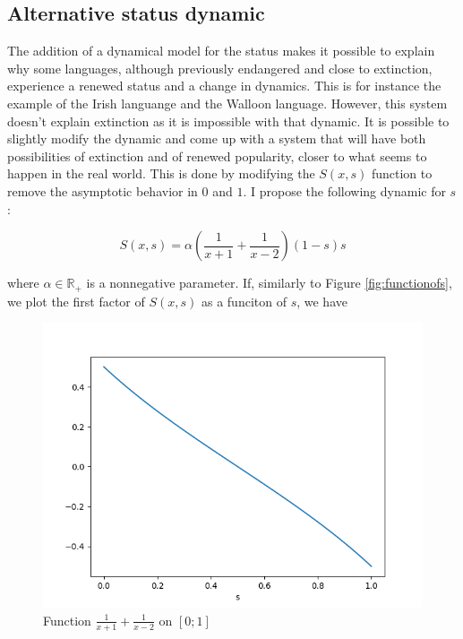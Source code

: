 \documentclass{article}
\begin{document}
\subsection*{Alternative status dynamic}
The addition of a dynamical model for the status makes it possible to explain why some languages, although previously endangered and close to extinction, experience a renewed status and a change in dynamics.
This is for instance the example of the Irish languange and the Walloon language.
However, this system doesn't explain extinction as it is impossible with that dynamic.
It is possible to slightly modify the dynamic and come up with a system that will have both possibilities of extinction and of renewed popularity, closer to what seems to happen in the real world.
This is done by modifying the $S(x,s)$ function to remove the asymptotic behavior in $0$ and $1$.
I propose the following dynamic for $s$ :

\begin{equation}
\label{eq:sdyn2}
S(x,s) =  \alpha (\frac{1}{x+1} + \frac{1}{x-2}) (1-s) s
\end{equation}

where $\alpha \in \mathbb{R}_{+}$ is a nonnegative parameter. If, similarly to Figure \ref{fig:functionofs}, we plot the first factor of $S(x,s)$ as a funciton of $s$, we have

\begin{figure}[H]
\centering
\includegraphics[scale=0.5]{functionofs2.png}
\caption{Function $\frac{1}{x+1}+\frac{1}{x-2}$ on $[0;1]$}
\label{fig:functionofs2}
\end{figure}
\end{document}
